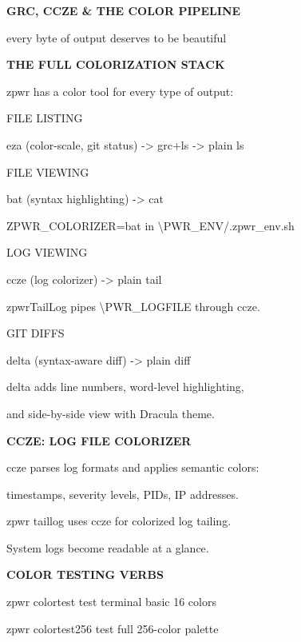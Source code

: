 \documentclass[11pt,a4paper,twoside]{book}
\begin{document}
\vspace{10pt}
{\large\bfseries\color{neoncyan} GRC, CCZE \& THE COLOR PIPELINE}\vspace{6pt}

every byte of output deserves to be beautiful


\vspace{12pt}
{\bfseries\color{neonyellow} THE FULL COLORIZATION STACK}\vspace{4pt}

zpwr has a color tool for every type of output:

FILE LISTING

eza (color-scale, git status) -> grc+ls -> plain ls

FILE VIEWING

bat (syntax highlighting) -> cat

\begin{codebox}
ZPWR\_COLORIZER=bat in \textbackslash{}PWR\_ENV/.zpwr\_env.sh\\
\end{codebox}

LOG VIEWING

ccze (log colorizer) -> plain tail

zpwrTailLog pipes \textbackslash{}PWR\_LOGFILE through ccze.

GIT DIFFS

delta (syntax-aware diff) -> plain diff

delta adds line numbers, word-level highlighting,

and side-by-side view with Dracula theme.


\vspace{12pt}
{\bfseries\color{neonyellow} CCZE: LOG FILE COLORIZER}\vspace{4pt}

ccze parses log formats and applies semantic colors:

timestamps, severity levels, PIDs, IP addresses.

zpwr taillog  uses ccze for colorized log tailing.

System logs become readable at a glance.


\vspace{12pt}
{\bfseries\color{neonyellow} COLOR TESTING VERBS}\vspace{4pt}

zpwr colortest       test terminal basic 16 colors

zpwr colortest256    test full 256-color palette
\end{document}
